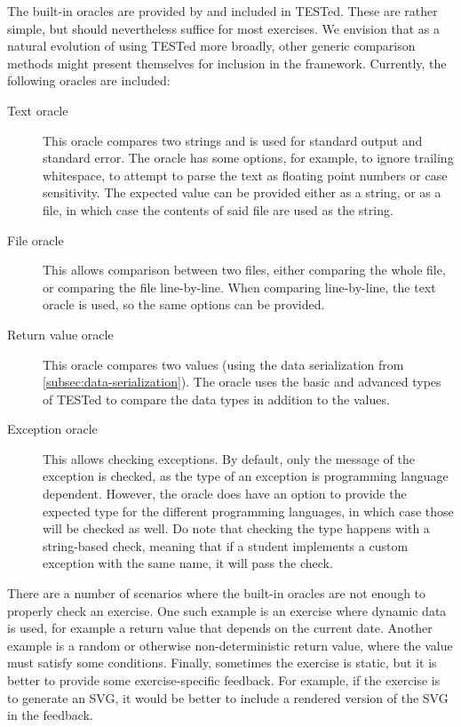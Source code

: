 \documentclass[../main]{subfiles}
\begin{document}
The built-in oracles are provided by and included in TESTed.
These are rather simple, but should nevertheless suffice for most exercises.
We envision that as a natural evolution of using TESTed more broadly, other generic comparison methods might present themselves for inclusion in the framework.
Currently, the following oracles are included:

\begin{description}
    \item[Text oracle] This oracle compares two strings and is used for standard output and standard error.
    The oracle has some options, for example, to ignore trailing whitespace, to attempt to parse the text as floating point numbers or case sensitivity.
    The expected value can be provided either as a string, or as a file, in which case the contents of said file are used as the string.
    \item[File oracle] This allows comparison between two files, either comparing the whole file, or comparing the file line-by-line.
    When comparing line-by-line, the text oracle is used, so the same options can be provided.
    \item[Return value oracle] This oracle compares two values (using the data serialization from \cref{subsec:data-serialization}).
    The oracle uses the basic and advanced types of TESTed to compare the data types in addition to the values.
    \item[Exception oracle] This allows checking exceptions.
    By default, only the message of the exception is checked, as the type of an exception is programming language dependent.
    However, the oracle does have an option to provide the expected type for the different programming languages, in which case those will be checked as well.
    Do note that checking the type happens with a string-based check, meaning that if a student implements a custom exception with the same name, it will pass the check.
\end{description}

There are a number of scenarios where the built-in oracles are not enough to properly check an exercise.
One such example is an exercise where dynamic data is used, for example a return value that depends on the current date.
Another example is a random or otherwise non-deterministic return value, where the value must satisfy some conditions.
Finally, sometimes the exercise is static, but it is better to provide some exercise-specific feedback.
For example, if the exercise is to generate an SVG, it would be better to include a rendered version of the SVG in the feedback.
\end{document}
